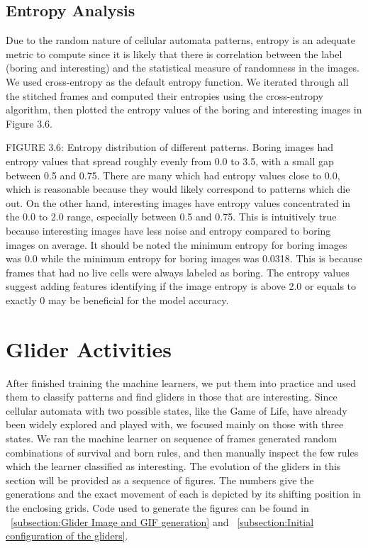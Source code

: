 \documentclass[12pt]{article}
\numberwithin{figure}{section} %
\begin{document}
\subsection{Entropy Analysis}
Due to the random nature of cellular automata patterns, entropy is an adequate metric to compute since it is likely that there is correlation between the label (boring and interesting) and the statistical measure of randomness in the images. We used cross-entropy as the default entropy function. We iterated through all the stitched frames and computed their entropies using the cross-entropy algorithm, then plotted the entropy values of the boring and interesting images in Figure 3.6. 
  
FIGURE 3.6: Entropy distribution of different patterns.
Boring images had entropy values that spread roughly evenly from 0.0 to 3.5, with a small gap between 0.5 and 0.75. There are many which had entropy values close to 0.0, which is reasonable because they would likely correspond to patterns which die out. On the other hand, interesting images have entropy values concentrated in the 0.0 to 2.0 range, especially between 0.5 and 0.75. This is intuitively true because interesting images have less noise and entropy compared to boring images on average. It should be noted the minimum entropy for boring images was 0.0 while the minimum entropy for boring images was 0.0318. This is because frames that had no live cells were always labeled as boring. The entropy values suggest adding features identifying if the image entropy is above 2.0 or equals to exactly 0 may be beneficial for the model accuracy. 

\newpage
\section{Glider Activities}
After finished training the machine learners, we put them into practice and used them to classify patterns and find gliders in those that are interesting. Since cellular automata with two possible states, like the Game of Life, have already been widely explored and played with, we focused mainly on those with three states. We ran the machine learner on sequence of frames generated random combinations of survival and born rules, and then manually inspect the few rules which the learner classified as interesting. The evolution of the gliders in this section will be provided as a sequence of figures. The numbers give the generations and the exact movement of each is depicted by its shifting position in the enclosing grids. Code used to generate the figures can be found in ~\ref{subsection:Glider Image and GIF generation} and ~\ref{subsection:Initial configuration of the gliders}. 
\end{document}
